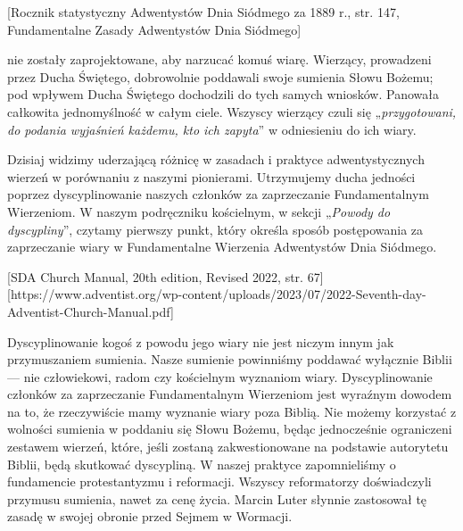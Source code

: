 [Rocznik statystyczny Adwentystów Dnia Siódmego za 1889 r., str. 147, Fundamentalne Zasady Adwentystów Dnia Siódmego]

 nie zostały zaprojektowane, aby narzucać komuś wiarę. Wierzący, prowadzeni przez Ducha Świętego, dobrowolnie poddawali swoje sumienia Słowu Bożemu; pod wpływem Ducha Świętego dochodzili do tych samych wniosków. Panowała całkowita jednomyślność w całym ciele. Wszyscy wierzący czuli się „\textit{przygotowani, do podania wyjaśnień każdemu, kto ich zapyta}” w odniesieniu do ich wiary.

Dzisiaj widzimy uderzającą różnicę w zasadach i praktyce adwentystycznych wierzeń w porównaniu z naszymi pionierami. Utrzymujemy ducha jedności poprzez dyscyplinowanie naszych członków za zaprzeczanie Fundamentalnym Wierzeniom. W naszym podręczniku kościelnym, w sekcji „\textit{Powody do dyscypliny}”, czytamy pierwszy punkt, który określa sposób postępowania za zaprzeczanie wiary w Fundamentalne Wierzenia Adwentystów Dnia Siódmego.


[SDA Church Manual, 20th edition, Revised 2022, str. 67][https://www.adventist.org/wp-content/uploads/2023/07/2022-Seventh-day-Adventist-Church-Manual.pdf]

Dyscyplinowanie kogoś z powodu jego wiary nie jest niczym innym jak przymuszaniem sumienia. Nasze sumienie powinniśmy poddawać wyłącznie Biblii — nie człowiekowi, radom czy kościelnym wyznaniom wiary. Dyscyplinowanie członków za zaprzeczanie Fundamentalnym Wierzeniom jest wyraźnym dowodem na to, że rzeczywiście mamy wyznanie wiary poza Biblią. Nie możemy korzystać z wolności sumienia w poddaniu się Słowu Bożemu, będąc jednocześnie ograniczeni zestawem wierzeń, które, jeśli zostaną zakwestionowane na podstawie autorytetu Biblii, będą skutkować dyscypliną. W naszej praktyce zapomnieliśmy o fundamencie protestantyzmu i reformacji. Wszyscy reformatorzy doświadczyli przymusu sumienia, nawet za cenę życia. Marcin Luter słynnie zastosował tę zasadę w swojej obronie przed Sejmem w Wormacji.

